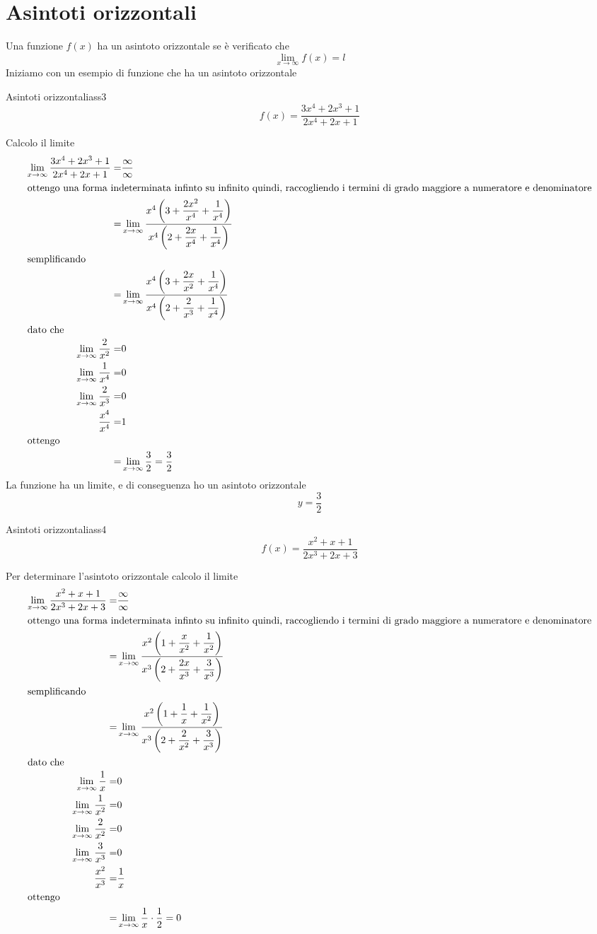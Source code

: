 \section{Asintoti orizzontali}
Una funzione $f(x)$ ha un asintoto orizzontale se è verificato che \[\lim_{x\to \infty}f(x)=l \]
Iniziamo con un esempio di funzione che ha un asintoto orizzontale
\begin{esempiot}{Asintoti orizzontali}{ass3}
	\[f(x)=\dfrac{3x^4+2x^3+1}{2x^4+2x+1}\]
\end{esempiot}
Calcolo il limite
\begin{align*}\index{Forma!indeterminata!infinito su infinito}
\lim_{x\to \infty}\dfrac{3x^4+2x^3+1}{2x^4+2x+1}=&\dfrac{\infty}{\infty}\\
\intertext{ottengo una forma indeterminata infinto su infinito quindi, raccogliendo i termini di grado maggiore a numeratore e denominatore}
=&\lim_{x\to \infty}\dfrac{x^4\left(3+\dfrac{2x^2}{x^4}+\dfrac{1}{x^4}\right)}{x^4\left(2+\dfrac{2x}{x^4}+\dfrac{1}{x^4}\right)}\\
\intertext{semplificando}
=&\lim_{x\to \infty}\dfrac{x^4\left(3+\dfrac{2x}{x^2}+\dfrac{1}{x^4}\right)}{x^4\left(2+\dfrac{2}{x^3}+\dfrac{1}{x^4}\right)}\\
\intertext{dato che}
\lim_{x\to \infty}\dfrac{2}{x^2}=&0\\
\lim_{x\to \infty}\dfrac{1}{x^4}=&0\\
\lim_{x\to \infty}\dfrac{2}{x^3}=&0\\
\dfrac{x^4}{x^4}=&1\\
\intertext{ottengo}
=&\lim_{x\to \infty}\dfrac{3}{2}=\dfrac{3}{2}\\
\end{align*}
La funzione ha un limite, e di conseguenza ho un asintoto orizzontale\[y=\dfrac{3}{2}\]  
\begin{esempiot}{Asintoti orizzontali}{ass4}
	\[f(x)=\dfrac{x^2+x+1}{2x^3+2x+3}\]
\end{esempiot}
Per determinare l'asintoto orizzontale calcolo il limite 
\begin{align*}\index{Forma!indeterminata!infinito su infinito}
\lim_{x\to \infty}\dfrac{x^2+x+1}{2x^3+2x+3}=&\dfrac{\infty}{\infty}\\
\intertext{ottengo una forma indeterminata infinto su infinito quindi, raccogliendo i termini di grado maggiore a numeratore e denominatore}
=&\lim_{x\to \infty}\dfrac{x^2\left(1+\dfrac{x}{x^2}+\dfrac{1}{x^2}\right)}{x^3\left(2+\dfrac{2x}{x^3}+\dfrac{3}{x^3}\right)}\\
\intertext{semplificando}
=&\lim_{x\to \infty}\dfrac{x^2\left(1+\dfrac{1}{x}+\dfrac{1}{x^2}\right)}{x^3\left(2+\dfrac{2}{x^2}+\dfrac{3}{x^3}\right)}\\
\intertext{dato che}
\lim_{x\to \infty}\dfrac{1}{x}=&0\\
\lim_{x\to \infty}\dfrac{1}{x^2}=&0\\
\lim_{x\to \infty}\dfrac{2}{x^2}=&0\\
\lim_{x\to \infty}\dfrac{3}{x^3}=&0\\
\dfrac{x^2}{x^3}=&\dfrac{1}{x}\\
\intertext{ottengo}
=&\lim_{x\to \infty}\dfrac{1}{x}\cdot\dfrac{1}{2}=0\\
\end{align*}
